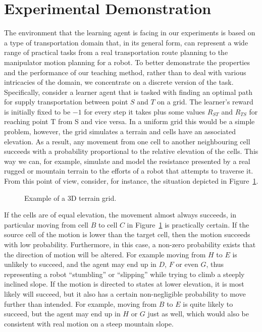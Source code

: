 \section{Experimental Demonstration}\label{sec: experiments}

The environment that the learning agent is facing in our experiments
is based on a type of transportation domain that, in its general form,
can represent a wide range of practical tasks from a real
transportation route planning to the manipulator motion planning for a
robot. To better demonstrate the properties and the performance of our
teaching method, rather than to deal with various intricacies of the
domain, we concentrate on a discrete version of the
task. Specifically, consider a learner agent that is tasked with
finding an optimal path for supply transportation between point $S$
and $T$ on a grid. The learner's reward is initially fixed to be $-1$
for every step it takes plus some values $R_{ST}$ and $R_{TS}$ for
reaching point T from S and vice versa. In a uniform grid this would
be a simple problem, however, the grid simulates a terrain and cells
have an associated elevation.  As a result, any movement from one cell
to another neighbouring cell succeeds with a probability proportional
to the relative elevation of the cells. This way we can, for example,
simulate and model the resistance presented by a real rugged or
mountain terrain to the efforts of a robot that attempts to traverse
it. From this point of view, consider, for instance, the situation
depicted in Figure~\ref{exp_motion}.

\begin{figure}[ht]
\centerline{}
\caption{\label{exp_motion}Example of a 3D terrain grid.}
\end{figure}

If the cells are of equal elevation, the movement almost always
succeeds, in particular moving from cell $B$ to cell $C$ in
Figure~\ref{exp_motion} is practically certain. If the source cell of
the motion is lower than the target cell, then the motion succeeds
with low probability. Furthermore, in this case, a non-zero
probability exists that the direction of motion will be
altered. For example moving from $H$ to $E$ is unlikely to succeed, and the
agent may end up in $D$, $F$ or even $G$, thus representing a robot
``stumbling'' or ``slipping'' while trying to climb a steeply inclined
slope. If the motion is directed to states at lower elevation, it is most
likely will succeed, but it also has a certain non-negligible
probability to move further than intended. For example,  moving from $B$ to $E$
is quite likely to succeed, but the agent may end up in $H$ or $G$
just as well, which would also be consistent with  real motion on a
steep mountain slope.


